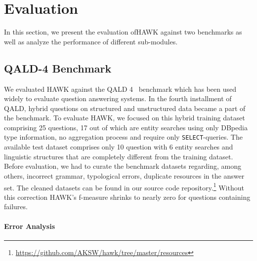 



\section{Evaluation}
\label{chahawk:sec:evaluation}

In this section, we present the evaluation ofHAWK against two benchmarks as well as analyze the performance of different sub-modules.

\subsection{QALD-4 Benchmark}

We evaluated HAWK against the \ac{QALD} 4~\cite{qald4} benchmark which has been used widely to evaluate question answering systems. 
In the fourth installment of \ac{QALD}, hybrid questions on structured and unstructured data became a part of the benchmark.
To evaluate HAWK, we focused on this hybrid training dataset comprising 25 questions, 17 out of which are entity searches using only DBpedia type information, no aggregation process and require only \texttt{SELECT}-queries. 
The available test dataset comprises only 10 question with 6 entity searches and linguistic structures that are completely different from the training dataset.
Before evaluation, we had to curate the benchmark datasets regarding, among others, incorrect grammar, typological errors, duplicate resources in the answer set.
The cleaned datasets can be found in our source code repository.\footnote{\url{https://github.com/AKSW/hawk/tree/master/resources}}
Without this correction HAWK's f-measure shrinks to nearly zero for questions containing failures.

\paragraph{Error Analysis}


